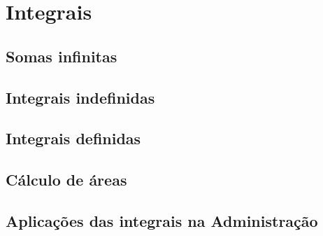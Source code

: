 
\chapter{Integrais}
\section{Somas infinitas}
\section{Integrais indefinidas}
\section{Integrais definidas}
\section{Cálculo de áreas}
\section{Aplicações das integrais na Administração}
